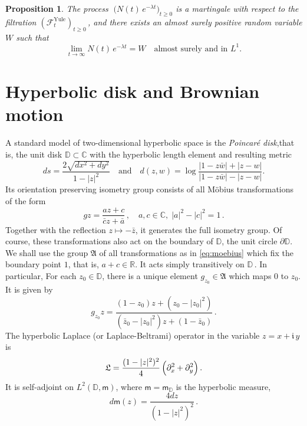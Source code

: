 \documentclass[12pt]{amsart}
\newcommand\Aff{\mathfrak A}
\newcommand\AND{\quad\text{and}\quad}
\newcommand\C{\mathbb C}
\newcommand\DD{\mathbb D}
\newcommand\F{\mathcal F}
\newcommand\gm{g}
\newcommand\HH{\mathbb H}
\newcommand\im{\mathfrak{i}\,}
\newcommand\Lap{\mathfrak{L}}
\newcommand\mm{\mathsf m}
\newcommand\nn{N}
\newcommand\R{\mathbb R}
\newcommand\ro{d}
\newcommand\ww{W}
\numberwithin{theorem}{section}
\newtheorem{pro}[theorem]{Proposition}%
\theoremstyle{definition}
\begin{document}
\begin{pro}\label{pro:mart}
The process  $\;\bigl(\nn(t) \,e^{-\lambda t}\bigr)_{t \ge 0}$ is a martingale with respect to the
filtration $(\F_t^{\text{Yule}})_{t \ge 0}\,$, and there exists an almost surely positive 
random variable $\ww$ such that
$$
\lim_{t \to \infty} \nn(t) \,e^{-\lambda t} = \ww%
\quad \text{almost surely and in } L^1.
$$
\end{pro}

\section{Hyperbolic disk and Brownian motion}\label{sec:hyp}

A standard model of two-dimensional hyperbolic space is the 
\emph{Poincar\'e disk},that is, the unit disk $\DD \subset \C$  
with the hyperbolic length element and resulting metric
\begin{equation}\label{eq:hypmetric}
ds =  \frac{2\sqrt{dx^2 + dy^2}}{1-|z|^2} \AND
\ro(z,w) = \log\frac{|1-z\bar w| + |z-w|}{|1-z\bar w| - |z-w|}.
\end{equation}
Its orientation preserving isometry group consists of all M\"obius transformations
of the form 
\begin{equation}\label{eq:moebius}
\gm z = \frac{az+ c}{\bar c z + \bar a}\,, \quad a, c \in \C, \; |a|^2-|c|^2 = 1\,.
\end{equation}
Together with the reflection $z \mapsto - \bar z$, it generates the full isometry group.
Of course, these transformations also act on the boundary of $\DD$, the unit circle $\partial \DD$.
We shall use the group $\Aff$ of all transformations as in \eqref{eq:moebius} which fix the
boundary point $1$, that is, $a+c \in \R$. It acts simply transitively on $\DD\,$. In particular,
For each $z_0 \in \DD$, there is a unique element $\gm_{z_0} \in \Aff$ which maps $0$ to $z_0$.
It is given by 
\begin{equation}\label{eq:gammaz0}
\gm_{z_0}z = \frac{(1-z_0)z + (z_0 - |z_0|^2)}{(\bar z_0 - |z_0|^2)z + (1-\bar z_0)}\,.
\end{equation}
The hyperbolic Laplace (or Laplace-Beltrami) operator in the variable $z = x + \im y$ is 
\begin{equation}\label{eq:hypLap}
\Lap = \frac{(1-|z|^2)^2}{4}\, \Bigl( \partial_x^2 + \partial_y^2\Bigr)\,. 
\end{equation}
It is self-adjoint on $L^2(\DD, \mm)$, where $\mm=\mm_{\DD}$ is
the hyperbolic measure,
\begin{equation}\label{eq:hypmeas}
d\mm(z) = \frac{4dz}{(1-|z|^2)^2}\,. 
\end{equation}
\end{document}

